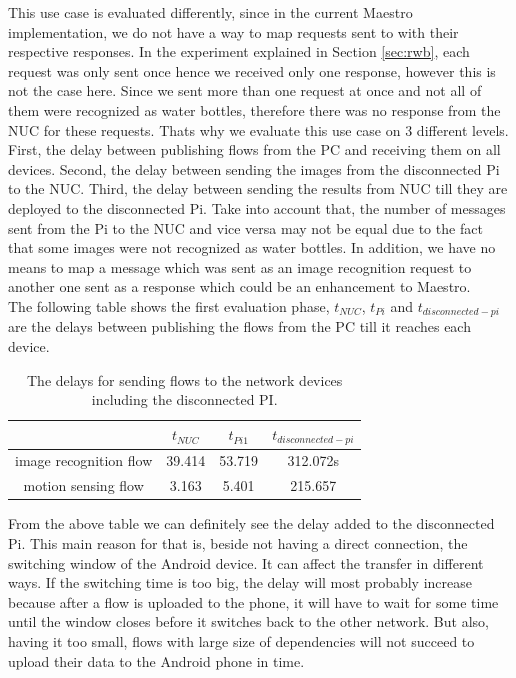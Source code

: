 \noindent This use case is evaluated differently, since in the current Maestro implementation, we do not have a way to map requests sent to with their respective responses. In the experiment explained in Section \ref{sec:rwb}, each request was only sent once hence we received only one response, however this is not the case here. Since we sent more than one request at once and not all of them were recognized as  water bottles, therefore there was no response from the NUC for these requests. Thats why we evaluate this use case on 3 different levels. First, the delay between publishing  flows from the PC and receiving them on all devices. Second, the delay between sending the images from the disconnected Pi to the NUC. Third, the delay between sending the results from NUC till they are deployed to the disconnected Pi.  Take into account that, the number of messages sent from the Pi to the NUC and vice versa may not be equal due to the fact that some images were not recognized as water bottles. In addition, we have no means to map a message which was sent as an image recognition request to another one sent as a response which could be an enhancement to Maestro. \\

\noindent The following table shows the first evaluation phase, $t_{NUC}$, $t_{Pi}$ and $t_{disconnected-pi}$ are the delays between publishing the flows from the PC till it reaches each device.
\begin{table}[H]
	\centering
	\begin{tabular}{c|c|c|c}\toprule
		&$t_{NUC}$  & $t_{Pi1}$  & $t_{disconnected-pi}$ \\ \midrule
		image recognition flow& 39.414&	53.719&	312.072s\\
		motion sensing flow&3.163&	5.401&	215.657\\
	\end{tabular}
	\caption{The delays for sending flows to the network devices including the disconnected PI.}
	\label{table:DIS}
\end{table}

\noindent From the above table we can definitely see the delay added to the disconnected Pi. This main reason for that  is, beside not having a direct connection, the switching window of the Android device. It can affect the transfer in different ways. If the switching time is too big, the delay will most probably increase because after a flow is uploaded to the phone, it will have to wait for some time until the window closes before it switches back to the other network. But also, having it too small, flows with  large size of dependencies will not succeed to upload their data to the Android phone in time. \\


